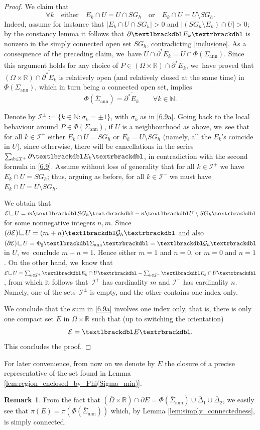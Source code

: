 \documentclass[11pt]{article}
\numberwithin{equation}{section}
\newcommand{\R}{\mathbb{R}}
\newcommand{\jump}[1]{\textup{\textlbrackdbl}{#1}\textup{\textrbrackdbl}}
\newcommand{\openannulus}{\Sigma_\mathrm{ann}}
\newcommand{\immclosedann}{\Phi({\overline\Sigma}_\mathrm{ann})}
\newcommand{\resa}{\mathop{\hbox{\vrule height 7pt width 0.5pt depth 0pt
\vrule height 0.5pt width 6pt depth 0pt}}\nolimits}
\newcommand{\resb}{\mathop{\hbox{\vrule height 4pt width 0.5pt depth 0pt
\vrule height 0.5pt width 3pt depth 0pt}}\nolimits}
\newcommand{\res}{\mathchoice{\resa}{\resa}{\resb}{\resb}}
\theoremstyle{definition}
\newtheorem{remark}[theorem]{Remark}
\begin{document}
\begin{proof}
We claim that
\[
\forall k\quad\text{either}\quad E_k\cap U=U \cap SG_h
\quad\text{or} \quad E_k\cap U=U\setminus SG_h.
\]
Indeed, assume for instance that $|E_k\cap U \cap
SG_h|>0$ and $|(SG_h\setminus E_k)\cap U|>0$; by the constancy lemma \cite{Krantz-Parks} it follows that $\partial\jump{E_k}$ is nonzero in the simply connected open set $SG_h$, contradicting \eqref{inclusione}.
As a consequence of the preceding claim, we~have $U\cap \partial^*E_k=U\cap \Phi(\openannulus)$. Since this argument holds for any choice of $P\in (\Omega\times\R)\cap \overline{\partial^*E_k}$, we~have proved that $(\Omega\times\R)\cap \overline{\partial^*E_k}$ is relatively open
(and relatively closed at the same time) in $\Phi(\openannulus)$, which in turn being a connected open set, implies
\[
\immclosedann=\overline{\partial^*E_k}\qquad \forall k\in \mathbb N.
\]

Denote by $\mathcal I^{\pm}:=\{k\in \mathbb N:\sigma_k=\pm1\}$, with
$\sigma_k$ as in \eqref{6.9a}.
Going back to the local behaviour around $P\in \Phi(\openannulus)$, if $U$ is a neighbourhood as above, we~see that for all $k\in \mathcal I^+$ either $E_k\cap U=SG_h$ or $E_k=U\setminus SG_h$ (namely, all the $E_k$'s coincide in $U$), since otherwise, there will be cancellations in the series $\sum_{k\in \mathcal I^+}\partial \jump{E_k}$, in contradiction with the second formula in \eqref{6.9}. Assume without loss of generality that for all $k\in \mathcal I^+$ we have $E_k\cap U=SG_h$; thus, arguing as before, for all $k\in \mathcal I^-$ we must have $E_k\cap U=U\setminus SG_h$.

We obtain that $\mathcal E\res U=m\jump{SG_h}-n\jump{U\setminus SG_h}$
for some nonnegative integers $n,m$. Since $(\partial \mathcal E)\res U=(m+n)\jump{\mathcal G_h}$
and also $(\partial\mathcal E)\res U=\Phi_\sharp\jump{\openannulus}=\jump{\mathcal G_h}$ in $U$, we~conclude $m+n=1$. Hence either $m=1$
and $n=0$, or $m=0$ and $n=1$. On the other hand, we~know that
$\mathcal E\res U=\sum_{k\in \mathcal I^+}\jump{E_k\cap U}-\sum_{k\in \mathcal I^-}\jump{E_k\cap U}$, from which it follows that~$\mathcal I^+$ has cardinality $m$ and $\mathcal I^-$ has cardinality $n$.
Namely, one of the sets~$\mathcal I^\pm$ is empty, and the other contains
one index only.

We conclude that the sum in \eqref{6.9a} involves one index only, that is, there is only one compact set $E$ in $\overline\Omega\times\R$ such that (up to switching the orientation)
\[
\mathcal E=\jump{E}.
\]
This concludes the proof.
\end{proof}
For later convenience, from now on we denote by $E$ the closure of a
precise representative of the set found in Lemma
\ref{lem:region_enclosed_by_Phi(Sigma_min)}.
\begin{remark}\label{rem:steiner-sym}
From the fact that $ (\overline \Omega\times\R)\cap \partial E=\immclosedann\cup\overline\Delta_1\cup\overline\Delta_2$, we
easily see that $\pi( E)=\pi(\immclosedann)$ which, by Lemma \ref{lem:simply_connectedness}, is simply connected.
\end{remark}
\end{document}
